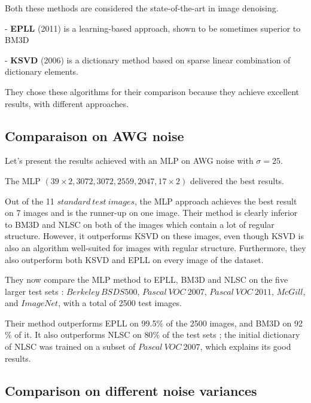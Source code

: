 \documentclass[10pt,a4paper]{article}
\newcommand{\svs}{\vspace{9pt}}
\begin{document}
\svs

Both these methods are considered the state-of-the-art in image denoising.

\svs

- \textbf{EPLL} (2011) is a learning-based approach, shown to be sometimes superior to BM3D

\svs

- \textbf{KSVD} (2006) is a dictionary method based on sparse linear combination of dictionary elements.

They chose these algorithms for their comparison because they achieve excellent results, with different approaches.

\subsection{Comparaison on AWG noise}

Let's present the results achieved with an MLP on AWG noise with $\sigma=25$.

\svs 

The MLP $(39 \times 2, 3072, 3072, 2559, 2047, 17 \times 2)$ delivered the best results.

\svs 

Out of the 11 $standard\ test\ images$, the MLP approach achieves the best result on 7 images and is the runner-up on one image.
Their method is clearly inferior to BM3D and NLSC on both of the images which contain a lot of regular structure. However, it outperforms KSVD on these images, even though KSVD is also an algorithm well-suited for images with regular structure. Furthermore, they also outperform both KSVD and EPLL on every image of the dataset.

\svs

They now compare the MLP method to EPLL, BM3D and NLSC on the five larger test sets : $Berkeley\ BSDS500$, $Pascal\ VOC\ 2007$, $Pascal\ VOC\ 2011$, $McGill$, and $ImageNet$, with a total of 2500 test images.

\svs

Their method outperforms EPLL on 99.5$\%$ of the 2500 images, and BM3D on 92$\%$ of it. It also outperforms NLSC on 80$\%$ of the test sets ; the initial dictionary of NLSC was trained on a subset of $Pascal\ VOC\ 2007$, which explains its good results.

\subsection{Comparison on different noise variances}
\end{document}
